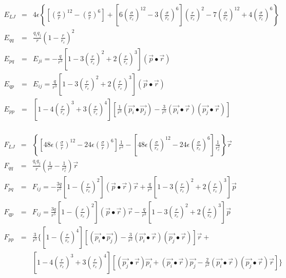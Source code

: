 \documentclass[12pt]{article}
\begin{document}
\begin{eqnarray*}
E_{LJ} & = &  4\epsilon \left\{ \left[ \left( \frac{\sigma}{r} \right)^{\!12} -
  \left( \frac{\sigma}{r} \right)^{\!6}  \right] +
  \left[ 6\left( \frac{\sigma}{r_c} \right)^{\!12} - 
  3\left(\frac{\sigma}{r_c}\right)^{\!6}\right]\left(\frac{r}{r_c}\right)^{\!2}
  - 7\left( \frac{\sigma}{r_c} \right)^{\!12} +
  4\left( \frac{\sigma}{r_c} \right)^{\!6}\right\} \\
E_{qq} & = & \frac{q_i q_j}{r}\left(1-\frac{r}{r_c}\right)^{\!2} \\
E_{pq} & = & E_{ji} = -\frac{q}{r^3} \left[ 1 -
  3\left(\frac{r}{r_c}\right)^{\!2} +
  2\left(\frac{r}{r_c}\right)^{\!3}\right] (\vec{p}\bullet\vec{r}) \\
E_{qp} & = & E_{ij} = \frac{q}{r^3} \left[ 1 -
  3\left(\frac{r}{r_c}\right)^{\!2} +
  2\left(\frac{r}{r_c}\right)^{\!3}\right] (\vec{p}\bullet\vec{r}) \\
E_{pp} & = & \left[1-4\left(\frac{r}{r_c}\right)^{\!3} +
  3\left(\frac{r}{r_c}\right)^{\!4}\right]\left[\frac{1}{r^3} 
  (\vec{p_i} \bullet \vec{p_j}) - \frac{3}{r^5} 
  (\vec{p_i} \bullet \vec{r}) (\vec{p_j} \bullet \vec{r})\right] \\
\end{eqnarray*}                           

\begin{eqnarray*}
F_{LJ} & = & \left\{\left[48\epsilon \left(\frac{\sigma}{r}\right)^{\!12} - 
  24\epsilon \left(\frac{\sigma}{r}\right)^{\!6} \right]\frac{1}{r^2} - 
  \left[48\epsilon \left(\frac{\sigma}{r_c}\right)^{\!12} - 24\epsilon 
  \left(\frac{\sigma}{r_c}\right)^{\!6} \right]\frac{1}{r_c^2}\right\}\vec{r}\\
F_{qq} & = & \frac{q_i q_j}{r}\left(\frac{1}{r^2} -
  \frac{1}{r_c^2}\right)\vec{r} \\
F_{pq} &=& F_{ij } =  -\frac{3q}{r^5} \left[ 1 -
  \left(\frac{r}{r_c}\right)^{\!2}\right](\vec{p}\bullet\vec{r})\vec{r} +
  \frac{q}{r^3}\left[1-3\left(\frac{r}{r_c}\right)^{\!2} +
  2\left(\frac{r}{r_c}\right)^{\!3}\right] \vec{p} \\
F_{qp} &=& F_{ij}  = \frac{3q}{r^5} \left[ 1 - 
  \left(\frac{r}{r_c}\right)^{\!2}\right] (\vec{p}\bullet\vec{r})\vec{r} -
  \frac{q}{r^3}\left[1-3\left(\frac{r}{r_c}\right)^{\!2} +
  2\left(\frac{r}{r_c}\right)^{\!3}\right] \vec{p} \\
F_{pp} & = &\frac{3}{r^5}\Bigg\{\left[1-\left(\frac{r}{r_c}\right)^{\!4}\right]
  \left[(\vec{p_i}\bullet\vec{p_j}) - \frac{3}{r^2} (\vec{p_i}\bullet\vec{r}) 
  (\vec{p_j} \bullet \vec{r})\right] \vec{r} + \\
  & & \left[1 -
  4\left(\frac{r}{r_c}\right)^{\!3}+3\left(\frac{r}{r_c}\right)^{\!4}\right]
  \left[ (\vec{p_j} \bullet \vec{r}) \vec{p_i} + (\vec{p_i} \bullet \vec{r}) 
  \vec{p_j} -\frac{2}{r^2} (\vec{p_i} \bullet \vec{r})
  (\vec{p_j} \bullet \vec{r})\vec{r}\right] \Bigg\} \\
\end{eqnarray*}                           
\end{document}
